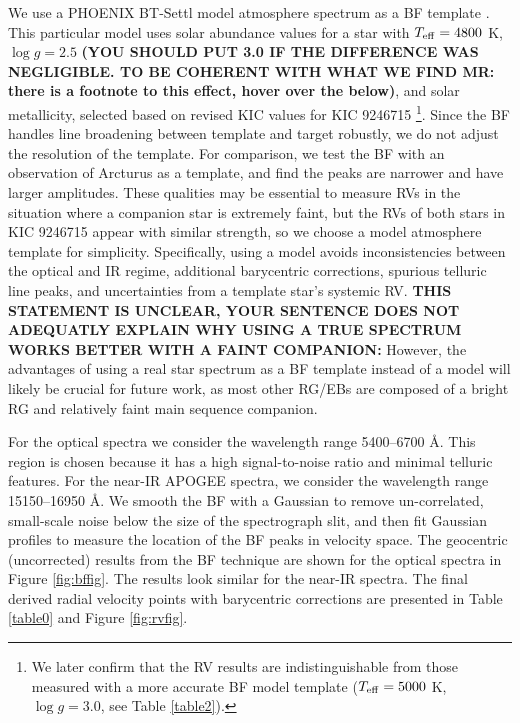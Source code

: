 We use a PHOENIX BT-Settl model atmosphere spectrum as a BF template \citep{all03}. This particular model uses \citet{asp09} solar abundance values for a star with $T_{\rm{eff}} = 4800$ K, $\log g = 2.5$ {\bf{(YOU SHOULD PUT 3.0 IF THE DIFFERENCE WAS NEGLIGIBLE. TO BE COHERENT WITH WHAT WE FIND MR: there is a footnote to this effect, hover over the \dagger below)}}, and solar metallicity, selected based on revised KIC values for KIC 9246715 \citep{hub14.2}\footnote{We later confirm that the RV results are indistinguishable from those measured with a more accurate BF model template ($T_{\rm{eff}} = 5000$ K, $\log g = 3.0$, see Table \ref{table2}).}. Since the BF handles line broadening between template and target robustly, we do not adjust the resolution of the template. For comparison, we test the BF with an observation of Arcturus as a template, and find the peaks are narrower and have larger amplitudes. These qualities may be essential to measure RVs in the situation where a companion star is extremely faint, but the RVs of both stars in KIC 9246715 appear with similar strength, so we choose a model atmosphere template for simplicity. Specifically, using a model avoids inconsistencies between the optical and IR regime, additional barycentric corrections, spurious telluric line peaks, and uncertainties from a template star's systemic RV. {\bf{THIS STATEMENT IS UNCLEAR, YOUR SENTENCE DOES NOT ADEQUATLY EXPLAIN WHY USING A TRUE SPECTRUM WORKS BETTER WITH A FAINT COMPANION:}} However, the advantages of using a real star spectrum as a BF template instead of a model will likely be crucial for future work, as most other RG/EBs are composed of a bright RG and relatively faint main sequence companion.

For the optical spectra we consider the wavelength range 5400--6700 \AA. This region is chosen because it has a high signal-to-noise ratio and minimal telluric features. For the near-IR APOGEE spectra, we consider the wavelength range 15150--16950 \AA. We smooth the BF with a Gaussian to remove un-correlated, small-scale noise below the size of the spectrograph slit, and then fit Gaussian profiles to measure the location of the BF peaks in velocity space. The geocentric (uncorrected) results from the BF technique are shown for the optical spectra in Figure \ref{fig:bffig}. The results look similar for the near-IR spectra. The final derived radial velocity points with barycentric corrections are presented in Table \ref{table0} and Figure \ref{fig:rvfig}.

